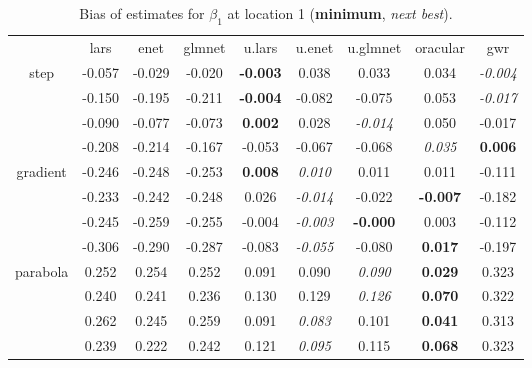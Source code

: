 \documentclass[authoryear, review, 11pt]{elsarticle}
\begin{document}
\begin{table}[ht]
\begin{center}
\begin{tabular}{ccccccccc}
  & lars & enet & glmnet & u.lars & u.enet & u.glmnet & oracular & gwr \\ 
  \cline{2-9}
  \multirow{4}{*}{step} & -0.057 & -0.029 & -0.020 & \textbf{-0.003} & 0.038 & 0.033 & 0.034 & \emph{-0.004} \\ 
  & -0.150 & -0.195 & -0.211 & \textbf{-0.004} & -0.082 & -0.075 & 0.053 & \emph{-0.017} \\ 
  & -0.090 & -0.077 & -0.073 & \textbf{0.002} & 0.028 & \emph{-0.014} & 0.050 & -0.017 \\ 
  & -0.208 & -0.214 & -0.167 & -0.053 & -0.067 & -0.068 & \emph{0.035} & \textbf{0.006} \\ 
  \cline{2-9}
  \multirow{4}{*}{gradient} & -0.246 & -0.248 & -0.253 & \textbf{0.008} & \emph{0.010} & 0.011 & 0.011 & -0.111 \\ 
  & -0.233 & -0.242 & -0.248 & 0.026 & \emph{-0.014} & -0.022 & \textbf{-0.007} & -0.182 \\ 
  & -0.245 & -0.259 & -0.255 & -0.004 & \emph{-0.003} & \textbf{-0.000} & 0.003 & -0.112 \\ 
  & -0.306 & -0.290 & -0.287 & -0.083 & \emph{-0.055} & -0.080 & \textbf{0.017} & -0.197 \\ 
  \cline{2-9}
  \multirow{4}{*}{parabola} & 0.252 & 0.254 & 0.252 & 0.091 & 0.090 & \emph{0.090} & \textbf{0.029} & 0.323 \\ 
  & 0.240 & 0.241 & 0.236 & 0.130 & 0.129 & \emph{0.126} & \textbf{0.070} & 0.322 \\ 
  & 0.262 & 0.245 & 0.259 & 0.091 & \emph{0.083} & 0.101 & \textbf{0.041} & 0.313 \\ 
  & 0.239 & 0.222 & 0.242 & 0.121 & \emph{0.095} & 0.115 & \textbf{0.068} & 0.323 \\ 
  \end{tabular}
\caption{Bias of estimates for $\beta_1$ at location 1 (\textbf{minimum}, \emph{next best}).\label{table:loc1-X1-BiasX}}
\end{center}
\end{table}
\end{document}
